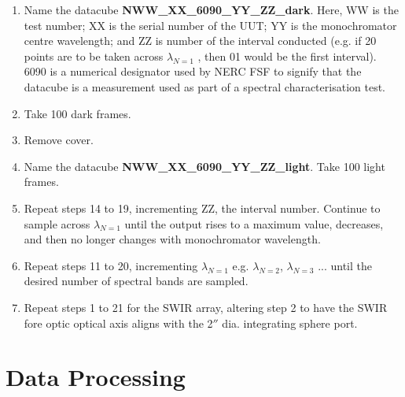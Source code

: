 \documentclass[nohyper,nobib]{tufte-book}
\begin{document}
\begin{enumerate}
	\item Name the datacube \textbf{NWW\_XX\_6090\_YY\_ZZ\_dark}. Here, WW is the test number; XX is the serial number of the UUT; YY is the monochromator centre wavelength; and ZZ is number of the interval conducted (e.g. if 20 points are to be taken across $\lambda_{N=1}$ , then 01 would be the first interval). 6090 is a numerical designator used by NERC FSF to signify that the datacube is a measurement used as part of a spectral characterisation test. 
	\item Take 100 dark frames.
	\item Remove cover.
	\item  Name the datacube \textbf{NWW\_XX\_6090\_YY\_ZZ\_light}. Take 100 light frames. 
	\item Repeat steps 14 to 19, incrementing ZZ, the interval number. Continue to sample across $\lambda_{N=1}$ until the output rises to a maximum value, decreases, and then no longer changes with monochromator wavelength. 
	\item Repeat steps 11 to 20, incrementing $\lambda_{N=1}$ e.g. $\lambda_{N=2}$, $\lambda_{N=3}$ ... until the desired number of spectral bands are sampled. 
	\item Repeat steps 1 to 21 for the SWIR array, altering step 2 to have the SWIR  fore optic optical axis aligns with the  2$''$ dia. integrating sphere port. 
\end{enumerate}

\section{Data Processing}
\end{document}
